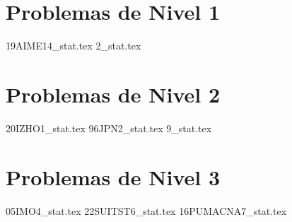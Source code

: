 \section{Problemas de Nivel 1}
{19AIME14_stat.tex} %
{2_stat.tex} %

\section{Problemas de Nivel 2}
{20IZHO1_stat.tex} %
{96JPN2_stat.tex} %
{9_stat.tex} %

\section{Problemas de Nivel 3}
{05IMO4_stat.tex} %
{22SUITST6_stat.tex} %
{16PUMACNA7_stat.tex} %